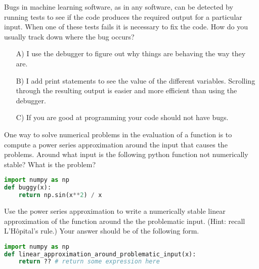 \documentclass{harvardml}
\begin{document}

\begin{problem}
Bugs in machine learning software, as in any software, can be detected by running
tests to see if the code produces the required output for a particular input.
When one of these tests fails it is necessary to fix the code.  How do you usually track down where
the bug occurs?
\begin{itemize}
\item[A)] I use the debugger to figure out why things are behaving the way they are.
\item[B)] I add print statements to see the value of the different variables.
Scrolling through the resulting output is easier and more efficient than using the debugger.
\item[C)] If you are good at programming your code should not have bugs.
\end{itemize}
\end{problem}


\begin{problem}[Stability]
One way to solve numerical problems in the evaluation of a function is to compute
a power series approximation around the input that causes the problems.
Around what input is the following python function not numerically stable?
What is the problem?

\begin{lstlisting}[language=python]
import numpy as np
def buggy(x):
    return np.sin(x**2) / x
\end{lstlisting}
Use the power series approximation to write a numerically stable linear approximation of the function around the the problematic input. (Hint: recall L'H\^opital's rule.) Your answer should be of the following form.

\begin{lstlisting}[language=python]
import numpy as np
def linear_approximation_around_problematic_input(x):
    return ?? # return some expression here
\end{lstlisting}
\end{problem}
\end{document}
